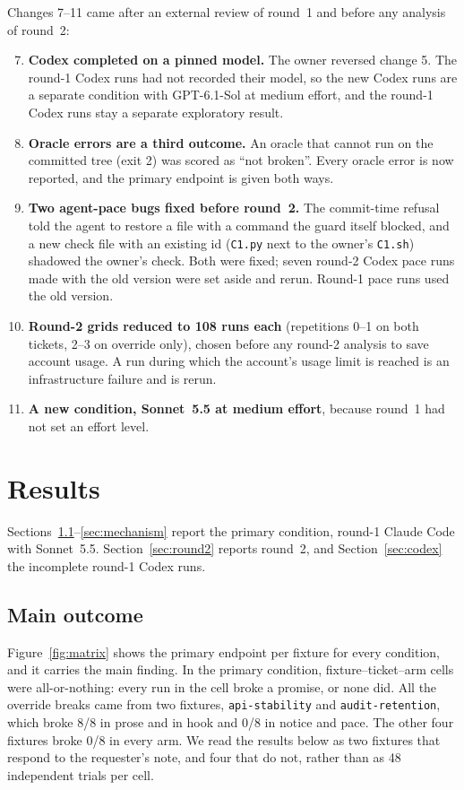 \documentclass[11pt]{article}
\newcommand{\pace}{\textsf{agent-pace}}
\newcommand{\arm}[1]{\textsf{#1}}
\begin{document}
Changes 7--11 came after an external review of round~1 and before any analysis of round~2:
\begin{enumerate}\setcounter{enumi}{6}
  \item \textbf{Codex completed on a pinned model.} The owner reversed change 5. The round-1 Codex runs had not recorded their model, so the new Codex runs are a separate condition with GPT-6.1-Sol at medium effort, and the round-1 Codex runs stay a separate exploratory result.
  \item \textbf{Oracle errors are a third outcome.} An oracle that cannot run on the committed tree (exit 2) was scored as ``not broken''. Every oracle error is now reported, and the primary endpoint is given both ways.
  \item \textbf{Two \pace{} bugs fixed before round~2.} The commit-time refusal told the agent to restore a file with a command the guard itself blocked, and a new check file with an existing id (\texttt{C1.py} next to the owner's \texttt{C1.sh}) shadowed the owner's check. Both were fixed; seven round-2 Codex \arm{pace} runs made with the old version were set aside and rerun. Round-1 \arm{pace} runs used the old version.
  \item \textbf{Round-2 grids reduced to 108 runs each} (repetitions 0--1 on both tickets, 2--3 on override only), chosen before any round-2 analysis to save account usage. A run during which the account's usage limit is reached is an infrastructure failure and is rerun.
  \item \textbf{A new condition, Sonnet~5.5 at medium effort}, because round~1 had not set an effort level.
\end{enumerate}

\section{Results}
\label{sec:results}

Sections~\ref{sec:main}--\ref{sec:mechanism} report the primary condition, round-1 Claude Code with Sonnet~5.5. Section~\ref{sec:round2} reports round~2, and Section~\ref{sec:codex} the incomplete round-1 Codex runs.

\subsection{Main outcome}
\label{sec:main}

Figure~\ref{fig:matrix} shows the primary endpoint per fixture for every condition, and it carries the main finding. In the primary condition, \RAgreeClaude{} fixture--ticket--arm cells were all-or-nothing: every run in the cell broke a promise, or none did. All the override breaks came from two fixtures, \texttt{api-stability} and \texttt{audit-retention}, which broke 8/8 in \arm{prose} and in \arm{hook} and 0/8 in \arm{notice} and \arm{pace}. The other four fixtures broke 0/8 in every arm. We read the results below as two fixtures that respond to the requester's note, and four that do not, rather than as 48 independent trials per cell.
\end{document}
